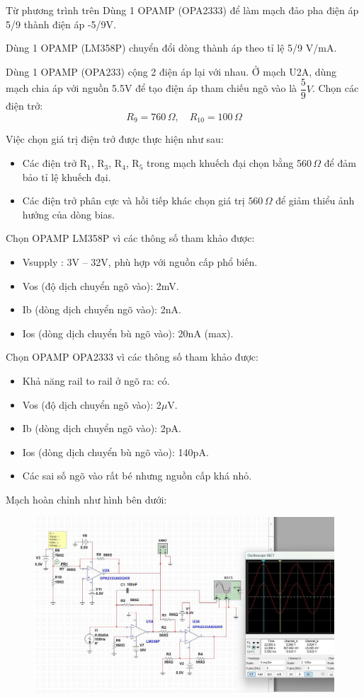 Từ phương trình trên
Dùng 1 OPAMP (OPA2333) để làm mạch đảo pha điện áp 5/9 thành điện áp -5/9V.

Dùng 1 OPAMP (LM358P) chuyển đổi dòng thành áp theo tỉ lệ 5/9 V/mA.

Dùng 1 OPAMP (OPA233) cộng 2 điện áp lại với nhau.
Ở mạch U2A, dùng mạch chia áp với nguồn 5.5V để tạo điện áp tham chiếu ngõ vào là $\dfrac{5}{9}V$. Chọn các điện trở:
\begin{equation*}
    R_9 = 760\,\Omega,\quad R_{10} = 100\,\Omega
\end{equation*}


Việc chọn giá trị điện trở được thực hiện như sau:
\begin{itemize}
    \item Các điện trở R$_1$, R$_3$, R$_4$, R$_5$ trong mạch khuếch đại chọn bằng 560\,$\Omega$ để đảm bảo tỉ lệ khuếch đại.
    \item Các điện trở phân cực và hồi tiếp khác chọn giá trị $560\,\Omega$ để giảm thiểu ảnh hưởng của dòng bias.
\end{itemize}
Chọn OPAMP LM358P vì các thông số tham khảo được:
\begin{itemize}
    \item Vsupply : 3V -- 32V, phù hợp với nguồn cấp phổ biến.
    \item Vos (độ dịch chuyển ngõ vào): 2mV.
    \item Ib (dòng dịch chuyển ngõ vào): 2nA.
    \item Ios (dòng dịch chuyển bù ngõ vào): 20nA (max).
\end{itemize}
Chọn OPAMP OPA2333 vì các thông số tham khảo được:
\begin{itemize}
    \item Khả năng rail to rail ở ngõ ra: có.
    \item Vos (độ dịch chuyển ngõ vào): 2$\mu $V.
    \item Ib (dòng dịch chuyển ngõ vào): 2pA.
    \item Ios (dòng dịch chuyển bù ngõ vào): 140pA.
    \item Các sai số ngõ vào rất bé nhưng nguồn cấp khá nhỏ.
\end{itemize}
Mạch hoàn chỉnh như hình bên dưới:
\begin{figure}[H]
    \centering
    \includegraphics[scale=0.32]{image/C8.png}
\end{figure}
